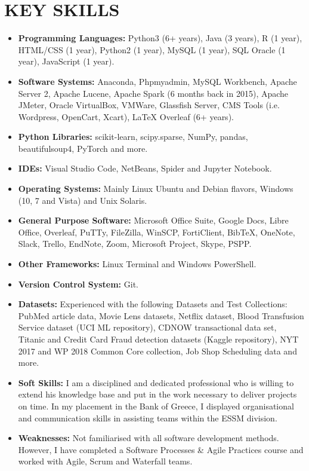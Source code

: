 \section{KEY SKILLS}
\begin{itemize}
    \item \textbf{Programming Languages:} Python3 (6+ years), Java (3 years), R (1 year), HTML/CSS (1 year), Python2 (1 year), MySQL (1 year), SQL Oracle (1 year), JavaScript (1 year).
    \item \textbf{Software Systems:} Anaconda, Phpmyadmin, MySQL Workbench, Apache Server 2, Apache Lucene, Apache Spark (6 months back in 2015), Apache JMeter, Oracle VirtualBox, VMWare, Glassfish Server, CMS Tools (i.e. Wordpress, OpenCart, Xcart), LaTeX Overleaf (6+ years).
    \item \textbf{Python Libraries:} scikit-learn, scipy.sparse, NumPy, pandas, beautifulsoup4, PyTorch and more.   
    \item \textbf{IDEs:} Visual Studio Code, NetBeans, Spider and Jupyter Notebook. 
    \item \textbf{Operating Systems:} Mainly Linux Ubuntu and Debian flavors, Windows (10, 7 and Vista) and Unix Solaris.
    \item \textbf{General Purpose Software:} Microsoft Office Suite, Google Docs, Libre Office, Overleaf, PuTTy, FileZilla, WinSCP, FortiClient, BibTeX, OneNote, Slack, Trello, EndNote, Zoom, Microsoft Project, Skype, PSPP.
    \item \textbf{Other Frameworks:} Linux Terminal and Windows PowerShell.
    \item \textbf{Version Control System:} Git.
    \item \textbf{Datasets:} Experienced with the following Datasets and Test Collections: PubMed article data, Movie Lens datasets, Netflix dataset, Blood Transfusion Service dataset (UCI ML repository), CDNOW transactional data set, Titanic and Credit Card Fraud detection datasets (Kaggle repository), NYT 2017 and WP 2018 Common Core collection, Job Shop Scheduling data and more.
    \item \textbf{Soft Skills:} I am a disciplined and dedicated professional who is willing to extend his knowledge base and put in the work necessary to deliver projects on time. In my placement in the Bank of Greece, I displayed organisational and communication skills in assisting teams within the ESSM division.
    \item \textbf{Weaknesses:} Not familiarised with all software development methods. However, I have completed a Software Processes \& Agile Practices course and worked with Agile, Scrum and Waterfall teams.
\end{itemize}